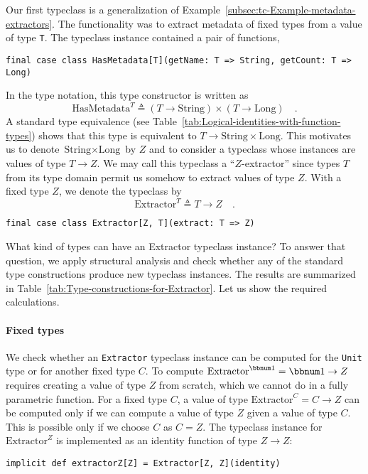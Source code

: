 Our first typeclass is a generalization of Example~\ref{subsec:tc-Example-metadata-extractors}.
The functionality was to extract metadata of fixed types from a value
of type \lstinline!T!. The typeclass instance contained a pair of
functions,
\begin{lstlisting}
final case class HasMetadata[T](getName: T => String, getCount: T => Long)
\end{lstlisting}
In the type notation, this type constructor is written as
\[
\text{HasMetadata}^{T}\triangleq(T\rightarrow\text{String})\times(T\rightarrow\text{Long})\quad.
\]
A standard type equivalence (see Table~\ref{tab:Logical-identities-with-function-types})
shows that this type is equivalent to $T\rightarrow\text{String}\times\text{Long}$.
This motivates us to denote $\text{String}\times\text{Long}$ by $Z$
and to consider a typeclass whose instances are values of type $T\rightarrow Z$.
We may call this typeclass a \textsf{``}$Z$-extractor\textsf{''}
since types $T$ from its type domain permit us somehow to extract
values of type $Z$. With a fixed type $Z$, we denote the typeclass
by
\[
\text{Extractor}^{T}\triangleq T\rightarrow Z\quad.
\]
\begin{lstlisting}
final case class Extractor[Z, T](extract: T => Z)
\end{lstlisting}
What kind of types can have an Extractor typeclass instance? To answer
that question, we apply structural analysis and check whether any
of the standard type constructions produce new typeclass instances.
The results are summarized in Table~\ref{tab:Type-constructions-for-Extractor}.
Let us show the required calculations.

\paragraph{Fixed types}

We check whether an \lstinline!Extractor! typeclass instance can
be computed for the \lstinline!Unit! type or for another fixed type
$C$. To compute $\text{Extractor}^{\bbnum 1}=\bbnum 1\rightarrow Z$
requires creating a value of type $Z$ from scratch, which we cannot
do in a fully parametric function. For a fixed type $C$, a value
of type $\text{Extractor}^{C}=C\rightarrow Z$ can be computed only
if we can compute a value of type $Z$ given a value of type $C$.
This is possible only if we choose $C$ as $C=Z$. The typeclass instance
for $\text{Extractor}^{Z}$ is implemented as an identity function
of type $Z\rightarrow Z$:
\begin{lstlisting}
implicit def extractorZ[Z] = Extractor[Z, Z](identity)
\end{lstlisting}


